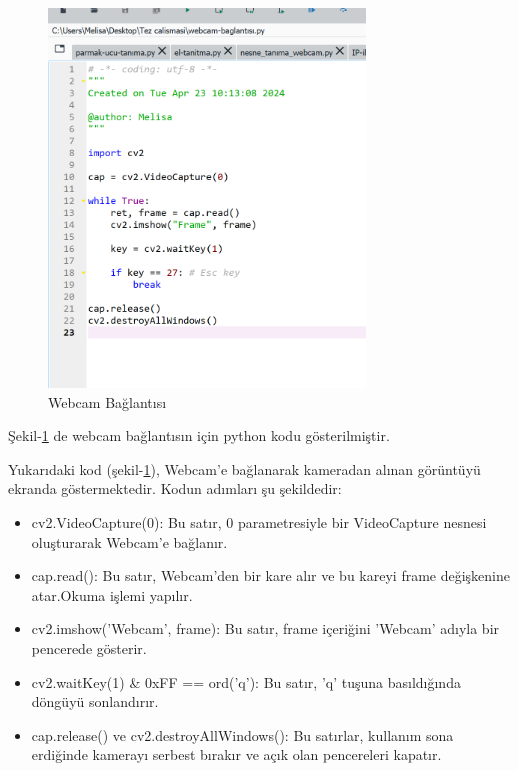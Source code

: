 \documentclass[11pt,a4paper]{report}
\begin{document}
	\begin{figure}[!h]
		\centering
		\includegraphics[width=0.75\textwidth]{webcam-baglantisi}
		\caption{Webcam Bağlantısı}
		\label{fig:ornek1}
	\end{figure}
	Şekil-\ref{fig:ornek1} de webcam bağlantısın için python kodu gösterilmiştir.
	\newline
	
	Yukarıdaki kod (şekil-\ref{fig:ornek1}), Webcam'e bağlanarak kameradan alınan görüntüyü ekranda göstermektedir. Kodun adımları şu şekildedir:
	\begin{itemize}
		\item cv2.VideoCapture(0): Bu satır, 0 parametresiyle bir VideoCapture nesnesi oluşturarak Webcam'e bağlanır.
		
		\item cap.read(): Bu satır, Webcam'den bir kare alır ve bu kareyi frame değişkenine atar.Okuma işlemi yapılır.
		
		\item cv2.imshow('Webcam', frame): Bu satır, frame içeriğini 'Webcam' adıyla bir pencerede gösterir.
		
		\item  cv2.waitKey(1) \& 0xFF == ord('q'): Bu satır, 'q' tuşuna basıldığında döngüyü sonlandırır.
		
		\item cap.release() ve cv2.destroyAllWindows(): Bu satırlar, kullanım sona erdiğinde kamerayı serbest bırakır ve açık olan pencereleri kapatır.
	\end{itemize}
	\newpage
	
\end{document}
